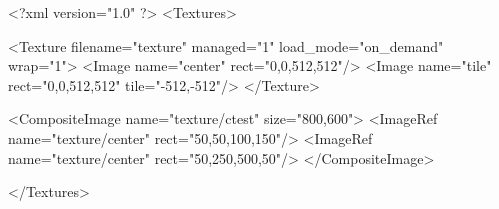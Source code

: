 <?xml version="1.0" ?>
<Textures>

	<Texture filename="texture" managed="1" load_mode="on_demand" wrap="1">
		<Image name="center" rect="0,0,512,512"/>
		<Image name="tile" rect="0,0,512,512" tile="-512,-512"/>
	</Texture>
	
	<CompositeImage name="texture/ctest" size="800,600">
		<ImageRef name="texture/center" rect="50,50,100,150"/>
		<ImageRef name="texture/center" rect="50,250,500,50"/>
	</CompositeImage>

</Textures>
